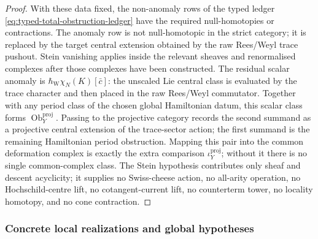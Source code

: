 \begin{proof}
With these data fixed, the non-anomaly rows of the typed ledger
\eqref{eq:typed-total-obstruction-ledger} have the required
null-homotopies or contractions.  The anomaly row is not null-homotopic
in the strict category; it is replaced by the target central extension
obtained by the raw Rees/Weyl trace pushout.  Stein vanishing applies
inside the relevant sheaves and renormalised complexes after those
complexes have been constructed.  The
residual scalar anomaly is
\(\hbar_{\mathrm W}\chi_N(K)[\bar c]\): the unscaled Lie central class
is evaluated by the trace character and then placed in the raw
Rees/Weyl commutator.  Together with any period class of the chosen
global Hamiltonian datum, this scalar class forms
\(\operatorname{Ob}^{\mathrm{proj}}_Y\).  Passing to the projective
category records the second summand as a projective central extension of
the trace-sector action; the first summand is the remaining Hamiltonian
period obstruction.  Mapping this pair into the common deformation
complex is exactly the extra comparison
\(\iota^{\mathrm{proj}}_Y\); without it there is no single common-complex
class.
The Stein hypothesis contributes only sheaf and descent acyclicity; it
supplies no Swiss-cheese action, no all-arity operation, no
Hochschild-centre lift, no cotangent-current lift, no counterterm tower,
no locality homotopy, and no cone contraction.
\end{proof}

\subsubsection{Concrete local realizations and global hypotheses}
\label{sssec:concrete-realizations}

